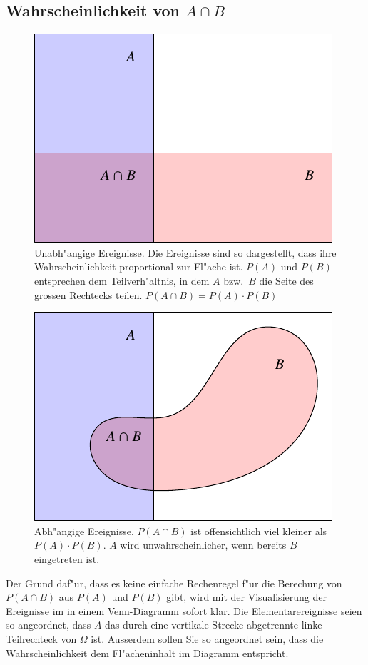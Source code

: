 \subsection{Wahrscheinlichkeit von $A\cap B$}
\begin{figure}
\begin{center}
\includegraphics[width=0.8\hsize]{images/abhaengigkeit-1}
\end{center}
\caption{Unabh"angige Ereignisse. Die Ereignisse sind so dargestellt,
dass ihre Wahrscheinlichkeit proportional zur Fl"ache ist. $P(A)$ und $P(B)$
entsprechen dem Teilverh"altnis, in dem $A$ bzw.~$B$ die Seite des grossen
Rechtecks teilen. $P(A\cap B)=P(A)\cdot P(B)$\label{unabhaengig}}
\end{figure}
\begin{figure}
\begin{center}
\includegraphics[width=0.8\hsize]{images/abhaengigkeit-2}
\end{center}
\caption{Abh"angige Ereignisse. $P(A\cap B)$ ist offensichtlich viel kleiner
als $P(A)\cdot P(B)$. $A$ wird unwahrscheinlicher, wenn bereits $B$ eingetreten
ist.
\label{abhaengig}}
\end{figure}
Der Grund daf"ur, dass es keine einfache Rechenregel f"ur die Berechung von 
$P(A\cap B)$ aus $P(A)$ und $P(B)$ gibt, wird mit der
Visualisierung der Ereignisse im in einem Venn-Diagramm sofort klar.
Die Elementarereignisse seien so angeordnet, dass $A$ das durch eine
vertikale Strecke abgetrennte linke Teilrechteck von $\Omega$ ist. Ausserdem
sollen Sie so angeordnet sein, dass die Wahrscheinlichkeit dem
Fl"acheninhalt im Diagramm entspricht.

